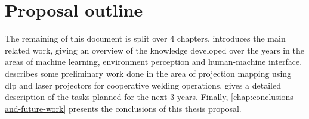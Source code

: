 \section{Proposal outline}

The remaining of this document is split over 4 chapters.  introduces the main related work, giving an overview of the knowledge developed over the years in the areas of machine learning, environment perception and human-machine interface.  describes some preliminary work done in the area of projection mapping using \gls{dlp} and laser projectors for cooperative welding operations.  gives a detailed description of the tasks planned for the next 3 years. Finally, \cref{chap:conclusions-and-future-work} presents the conclusions of this thesis proposal.
